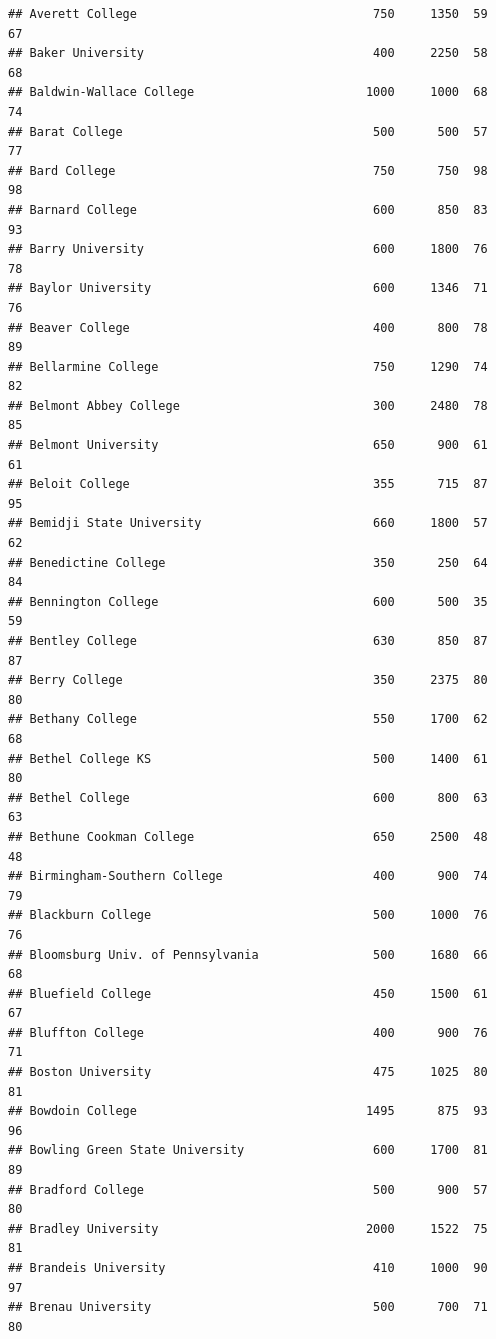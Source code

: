\documentclass[
]{article}
\begin{document}
\begin{verbatim}
## Averett College                                 750     1350  59       67
## Baker University                                400     2250  58       68
## Baldwin-Wallace College                        1000     1000  68       74
## Barat College                                   500      500  57       77
## Bard College                                    750      750  98       98
## Barnard College                                 600      850  83       93
## Barry University                                600     1800  76       78
## Baylor University                               600     1346  71       76
## Beaver College                                  400      800  78       89
## Bellarmine College                              750     1290  74       82
## Belmont Abbey College                           300     2480  78       85
## Belmont University                              650      900  61       61
## Beloit College                                  355      715  87       95
## Bemidji State University                        660     1800  57       62
## Benedictine College                             350      250  64       84
## Bennington College                              600      500  35       59
## Bentley College                                 630      850  87       87
## Berry College                                   350     2375  80       80
## Bethany College                                 550     1700  62       68
## Bethel College KS                               500     1400  61       80
## Bethel College                                  600      800  63       63
## Bethune Cookman College                         650     2500  48       48
## Birmingham-Southern College                     400      900  74       79
## Blackburn College                               500     1000  76       76
## Bloomsburg Univ. of Pennsylvania                500     1680  66       68
## Bluefield College                               450     1500  61       67
## Bluffton College                                400      900  76       71
## Boston University                               475     1025  80       81
## Bowdoin College                                1495      875  93       96
## Bowling Green State University                  600     1700  81       89
## Bradford College                                500      900  57       80
## Bradley University                             2000     1522  75       81
## Brandeis University                             410     1000  90       97
## Brenau University                               500      700  71       80

\end{verbatim}
\end{document}
